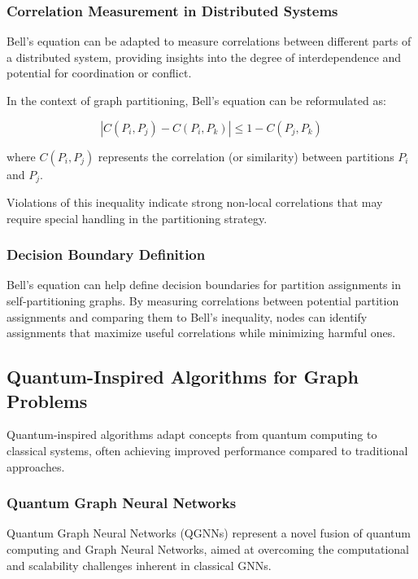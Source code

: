 \documentclass{article}
\begin{document}
\subsubsection{Correlation Measurement in Distributed Systems}

Bell's equation can be adapted to measure correlations between different parts of a distributed system, providing insights into the degree of interdependence and potential for coordination or conflict.

In the context of graph partitioning, Bell's equation can be reformulated as:

\begin{equation}
|C(P_i, P_j) - C(P_i, P_k)| \leq 1 - C(P_j, P_k)
\end{equation}

where $C(P_i, P_j)$ represents the correlation (or similarity) between partitions $P_i$ and $P_j$.

Violations of this inequality indicate strong non-local correlations that may require special handling in the partitioning strategy.

\subsubsection{Decision Boundary Definition}

Bell's equation can help define decision boundaries for partition assignments in self-partitioning graphs. By measuring correlations between potential partition assignments and comparing them to Bell's inequality, nodes can identify assignments that maximize useful correlations while minimizing harmful ones.

\subsection{Quantum-Inspired Algorithms for Graph Problems}

Quantum-inspired algorithms adapt concepts from quantum computing to classical systems, often achieving improved performance compared to traditional approaches.

\subsubsection{Quantum Graph Neural Networks}

Quantum Graph Neural Networks (QGNNs) \cite{ceschini2024graphs} represent a novel fusion of quantum computing and Graph Neural Networks, aimed at overcoming the computational and scalability challenges inherent in classical GNNs.
\end{document}
